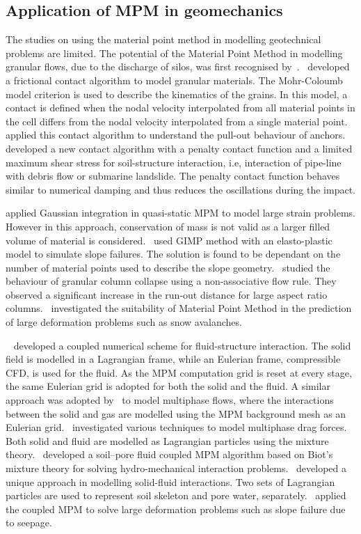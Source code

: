 \subsection{Application of MPM in geomechanics}

The studies on using the material point method in modelling
geotechnical problems are limited. The potential of the Material Point Method 
in modelling granular flows, due to the discharge of silos, was first 
recognised by~\citet{Wieckowski1999}.~\citet{Bardenhagen2001} developed a 
frictional contact algorithm to model granular materials. The Mohr-Coloumb 
model criterion is used to describe the kinematics of the grains. In this 
model, a contact is defined when the nodal velocity interpolated from all 
material points in the cell differs from the nodal velocity interpolated from a 
single material point.~\citet{Coetzee2005} applied this contact algorithm to 
understand the pull-out behaviour of anchors.~\citet{Ma2014} developed a new 
contact algorithm with a penalty contact function and a limited maximum shear 
stress for soil-structure interaction, i.e, interaction of pipe-line with 
debris flow or submarine landslide. The penalty contact function behaves 
similar to numerical damping and thus reduces the oscillations during the 
impact. 

\citet{Beuth2010} applied Gaussian integration in quasi-static MPM to model 
large strain problems. However in this approach, conservation of mass is not 
valid as a larger filled volume of material is considered.~\citet{Andersen2010} 
used GIMP method with an elasto-plastic model to simulate slope failures. The 
solution is found to be dependant on the number of material points used to 
describe the slope geometry.~\citet{Mast2014} studied the behaviour of granular 
column collapse using a non-associative flow rule. They observed a 
significant increase in the run-out distance for large aspect ratio 
columns.~\citet{Mast2014a} investigated the suitability of Material Point 
Method in the prediction of large deformation problems such as snow 
avalanches. 

~\citet{Guilkey2007} developed a coupled numerical scheme for fluid-structure 
interaction. The solid field is modelled in a Lagrangian frame, while an 
Eulerian frame, compressible CFD, is used for the fluid. As the MPM computation 
grid is reset at every stage, the same Eulerian grid is adopted for both the 
solid and the fluid. A similar approach was adopted by~\cite{Zhang2008} to 
model multiphase flows, where the interactions between the solid and gas are 
modelled using the MPM background mesh as an Eulerian 
grid.~\citet{Mackenzie-Helnwein2010} investigated various techniques to model 
multiphase drag forces. Both solid and fluid are modelled as Lagrangian 
particles using the mixture theory.~\citet{Abe2013} developed a soil–pore fluid 
coupled MPM algorithm based on Biot’s mixture theory for solving 
hydro-mechanical interaction problems.~\citet{Bandara2013} developed a unique 
approach in modelling solid-fluid interactions. Two sets of Lagrangian 
particles are used to represent soil skeleton and pore water, 
separately.~\citet{Bandara2013} applied the coupled MPM to solve large 
deformation problems such as slope failure due to seepage.

